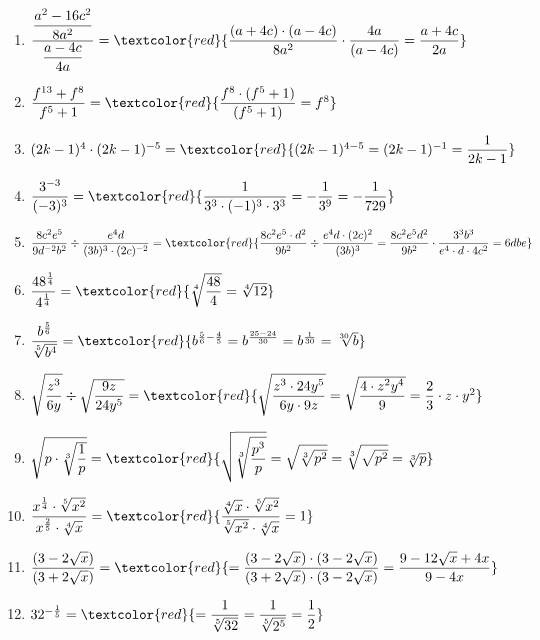 \documentclass[11pt, a4paper, twoside, fleqn]{article}
\begin{document}
\begin{enumerate} [itemsep=3ex]
\item $ \dfrac{\dfrac{a^{2} - 16c^{2}}{8a^{2}}}{\dfrac{a - 4c}{4a}} = \textcolor{red}{\dfrac{(a + 4c) \cdot (a - 4c)}{8a^{2}} \cdot \dfrac{4a}{(a - 4c)} = \dfrac{a + 4c}{2a}} $
\item $ \dfrac{f^{13} + f^{8}}{f^{5} + 1} = \textcolor{red}{\dfrac{f^{8}\cdot (f^{5} + 1)}{(f^{5} + 1)} = f^{8}} $
\item $ (2k - 1)^{4} \cdot (2k - 1)^{-5} = \textcolor{red}{(2k - 1)^{4 - 5} = (2k - 1)^{-1} = \dfrac{1}{2k - 1}} $
\item $ \dfrac{3^{-3}}{(-3)^{3}} = \textcolor{red}{\dfrac{1}{3^{3}\cdot (-1)^{3} \cdot 3^{3}} = - \dfrac{1}{3^{9}} = - \dfrac{1}{729}} $
\item $\dfrac{8c^{2}e^{5}}{9d^{-2}b^{2}} \div \dfrac{e^{4}d}{(3b)^{3} \cdot (2c)^{-2}} = \textcolor{red}{\dfrac{8c^{2}e^{5} \cdot d^{2}}{9b^{2}} \div \dfrac{e^{4}d \cdot (2c)^{2}}{(3b)^{3}} = \dfrac{8c^{2}e^{5}d^{2}}{9b^{2}} \cdot \dfrac{3^{3} b^{3}}{e^{4} \cdot d \cdot 4c^{2}} = 6dbe } $ 
\item $ \dfrac{48^{\frac{1}{4}}}{4^{\frac{1}{4}}} = \textcolor{red}{\sqrt[4]{\dfrac{48}{4}} = \sqrt[4]{12}} $
\item $ \dfrac{b^{\frac{5}{6}}}{\sqrt[5]{b^{4}}} = \textcolor{red}{b^{\frac{5}{6} - \frac{4}{5}} = b^{\frac{25 - 24}{30}} = b^{\frac{1}{30}} = \sqrt[30]{b}} $
\item $ \sqrt{\dfrac{z^{3}}{6y}} \div \sqrt{\dfrac{9z}{24y^{5}}} = \textcolor{red}{\sqrt{\dfrac{z^{3} \cdot 24y^{5}}{6y \cdot 9z}} = \sqrt{\dfrac{4 \cdot z^{2}y^{4}}{9}} = \dfrac{2}{3} \cdot z \cdot y^{2}} $
\item $ \sqrt{p \cdot \sqrt[3]{\dfrac{1}{p}}} = \textcolor{red}{\sqrt{\sqrt[3]{\dfrac{p^{3}}{p}}} = \sqrt{\sqrt[3]{p^{2}}} = \sqrt[3]{\sqrt{p^{2}}} = \sqrt[3]{p}} $
\item $ \dfrac{x^{\frac{1}{4}} \cdot \sqrt[5]{x^{2}}}{x^{\frac{2}{5}} \cdot \sqrt[4]{x}} = \textcolor{red}{\dfrac{\sqrt[4]{x} \cdot \sqrt[5]{x^{2}}}{\sqrt[5]{x^{2}} \cdot \sqrt[4]{x}} = 1} $
\item $ \dfrac{(3 - 2\sqrt{x})}{(3 + 2\sqrt{x})} = \textcolor{red}{= \dfrac{(3 - 2\sqrt{x}) \cdot (3 - 2\sqrt{x})}{(3 + 2\sqrt{x}) \cdot(3 - 2\sqrt{x})} = \dfrac{9 - 12\sqrt{x} + 4x}{9 - 4x}} $
\item $ 32^{-\frac{1}{5}} = \textcolor{red}{ = \dfrac{1}{\sqrt[5]{32}} = \dfrac{1}{\sqrt[5]{2^{5}}}= \dfrac{1}{2}} $
\end{enumerate}
\end{document}
